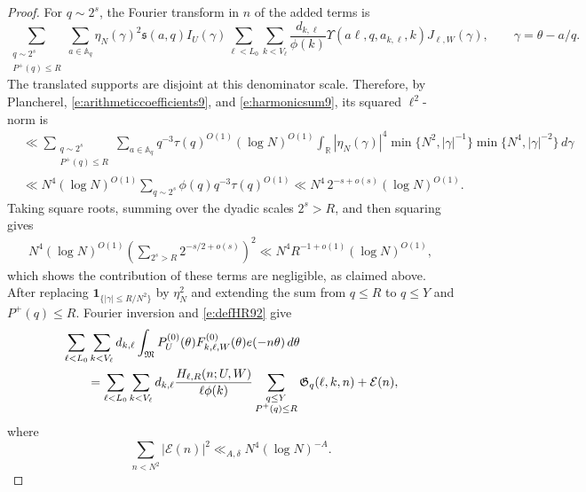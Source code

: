\documentclass[12pt,reqno]{amsart}
\numberwithin{equation}{section}
\theoremstyle{definition}
\theoremstyle{remark}
\begin{document}
\begin{proof}
For \(q\sim2^s\),  the Fourier
transform in \(n\) of the added terms is
\[
 \sum_{\substack{q\sim2^s\\P^+(q)\leq R}}\sum_{a\in\mathbb A_q}
 \eta_N(\gamma)^2\mathfrak s(a,q)I_U(\gamma)
 \sum_{\ell<L_0}\sum_{k<V_\ell}
 \frac{d_{k,\ell}}{\phi(k)}
 \Upsilon(a\ell,q,a_{k,\ell},k)J_{\ell,W}(\gamma),
 \qquad \gamma=\theta-a/q.
\]
The translated supports are disjoint at this denominator scale.
Therefore, by Plancherel, \eqref{e:arithmeticcoefficients9}, and
\eqref{e:harmonicsum9}, its squared \(\ell^2\)-norm is
\begin{align*}
 &\ll
 \sum_{\substack{q\sim2^s\\P^+(q)\leq R}}\sum_{a\in\mathbb A_q}
 q^{-3}\tau(q)^{O(1)}(\log N)^{O(1)}
 \int_{\mathbb R}|\eta_N(\gamma)|^4
 \min\{N^2,|\gamma|^{-1}\}
 \min\{N^4,|\gamma|^{-2}\}\,d\gamma\\
 &\ll
 N^4(\log N)^{O(1)}
 \sum_{q\sim2^s}\phi(q)q^{-3}\tau(q)^{O(1)}
 \ll N^4\,2^{-s+o(s)}(\log N)^{O(1)}.
\end{align*}
Taking square roots, summing over the dyadic scales \(2^s>R\), and
then squaring gives
\begin{align*}
 N^4(\log N)^{O(1)}
 \left(\sum_{2^s>R}2^{-s/2+o(s)}\right)^2
 \ll N^4R^{-1+o(1)}(\log N)^{O(1)},
\end{align*}
which shows the contribution of these terms are negligible, as claimed above. 
After replacing
\(\mathbf1_{\{|\gamma|\leq R/N^2\}}\) by \(\eta_N^2\) and extending
the sum from \(q\leq R\) to $q\leq Y$ and $P^+(q)\leq R$.
Fourier inversion and \eqref{e:defHR92} give
\begin{align}\label{e:completedmajor9}
 &\sum_{\ell<L_0}\sum_{k<V_\ell}d_{k,\ell}
 \int_{\mathfrak M}
 P_U^{(0)}(\theta)F_{k,\ell,W}^{(0)}(\theta)
 e(-n\theta)\,d\theta\notag\\
 &\qquad=
 \sum_{\ell<L_0}\sum_{k<V_\ell}
 d_{k,\ell}\frac{H_{\ell,R}(n;U,W)}{\ell\phi(k)}
 \sum_{\substack{q\leq Y\\P^+(q)\leq R}}
 \mathfrak G_q(\ell,k,n)
 +\mathcal E(n),
\end{align}
where
\[
 \sum_{n<N^2}|\mathcal E(n)|^2
 \ll_{A,\delta}N^4(\log N)^{-A}.
\]


\end{proof}
\end{document}

